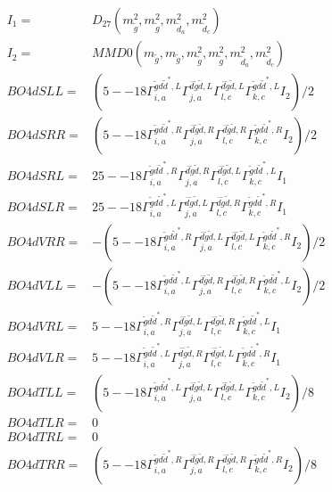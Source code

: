 \documentclass[A4,landscape]{article}
\begin{document}
\begin{align} 
I_1 = & D_{27}(m^2_{\tilde{g}}, m^2_{\tilde{g}}, m^2_{\tilde{d}_{{a}}}, m^2_{\tilde{d}_{{c}}}) \\ 
I_2 = & MMD0(m_{\tilde{g}}, m_{\tilde{g}}, m^2_{\tilde{g}}, m^2_{\tilde{g}}, m^2_{\tilde{d}_{{a}}}, m^2_{\tilde{d}_{{c}}}) \\ 
  BO4dSLL= & (5
--
18 \Gamma^{\tilde{g} d \tilde{d}^*,L}_{i, a} \Gamma^{\bar{d}\tilde{g} \tilde{d} ,L}_{j, a} \Gamma^{\bar{d}\tilde{g} \tilde{d} ,L}_{l, c} \Gamma^{\tilde{g} d \tilde{d}^*,L}_{k, c} I_2)/2 \\ 
  BO4dSRR= & (5
--
18 \Gamma^{\tilde{g} d \tilde{d}^*,R}_{i, a} \Gamma^{\bar{d}\tilde{g} \tilde{d} ,R}_{j, a} \Gamma^{\bar{d}\tilde{g} \tilde{d} ,R}_{l, c} \Gamma^{\tilde{g} d \tilde{d}^*,R}_{k, c} I_2)/2 \\ 
  BO4dSRL= & 2 5
--
18 \Gamma^{\tilde{g} d \tilde{d}^*,R}_{i, a} \Gamma^{\bar{d}\tilde{g} \tilde{d} ,R}_{j, a} \Gamma^{\bar{d}\tilde{g} \tilde{d} ,L}_{l, c} \Gamma^{\tilde{g} d \tilde{d}^*,L}_{k, c} I_1 \\ 
  BO4dSLR= & 2 5
--
18 \Gamma^{\tilde{g} d \tilde{d}^*,L}_{i, a} \Gamma^{\bar{d}\tilde{g} \tilde{d} ,L}_{j, a} \Gamma^{\bar{d}\tilde{g} \tilde{d} ,R}_{l, c} \Gamma^{\tilde{g} d \tilde{d}^*,R}_{k, c} I_1 \\ 
  BO4dVRR= & -(5
--
18 \Gamma^{\tilde{g} d \tilde{d}^*,R}_{i, a} \Gamma^{\bar{d}\tilde{g} \tilde{d} ,L}_{j, a} \Gamma^{\bar{d}\tilde{g} \tilde{d} ,L}_{l, c} \Gamma^{\tilde{g} d \tilde{d}^*,R}_{k, c} I_2)/2 \\ 
  BO4dVLL= & -(5
--
18 \Gamma^{\tilde{g} d \tilde{d}^*,L}_{i, a} \Gamma^{\bar{d}\tilde{g} \tilde{d} ,R}_{j, a} \Gamma^{\bar{d}\tilde{g} \tilde{d} ,R}_{l, c} \Gamma^{\tilde{g} d \tilde{d}^*,L}_{k, c} I_2)/2 \\ 
  BO4dVRL= & 5
--
18 \Gamma^{\tilde{g} d \tilde{d}^*,R}_{i, a} \Gamma^{\bar{d}\tilde{g} \tilde{d} ,L}_{j, a} \Gamma^{\bar{d}\tilde{g} \tilde{d} ,R}_{l, c} \Gamma^{\tilde{g} d \tilde{d}^*,L}_{k, c} I_1 \\ 
  BO4dVLR= & 5
--
18 \Gamma^{\tilde{g} d \tilde{d}^*,L}_{i, a} \Gamma^{\bar{d}\tilde{g} \tilde{d} ,R}_{j, a} \Gamma^{\bar{d}\tilde{g} \tilde{d} ,L}_{l, c} \Gamma^{\tilde{g} d \tilde{d}^*,R}_{k, c} I_1 \\ 
  BO4dTLL= & (5
--
18 \Gamma^{\tilde{g} d \tilde{d}^*,L}_{i, a} \Gamma^{\bar{d}\tilde{g} \tilde{d} ,L}_{j, a} \Gamma^{\bar{d}\tilde{g} \tilde{d} ,L}_{l, c} \Gamma^{\tilde{g} d \tilde{d}^*,L}_{k, c} I_2)/8 \\ 
  BO4dTLR= & 0 \\ 
  BO4dTRL= & 0 \\ 
  BO4dTRR= & (5
--
18 \Gamma^{\tilde{g} d \tilde{d}^*,R}_{i, a} \Gamma^{\bar{d}\tilde{g} \tilde{d} ,R}_{j, a} \Gamma^{\bar{d}\tilde{g} \tilde{d} ,R}_{l, c} \Gamma^{\tilde{g} d \tilde{d}^*,R}_{k, c} I_2)/8 \\ 
\end{align} 
\end{document}
